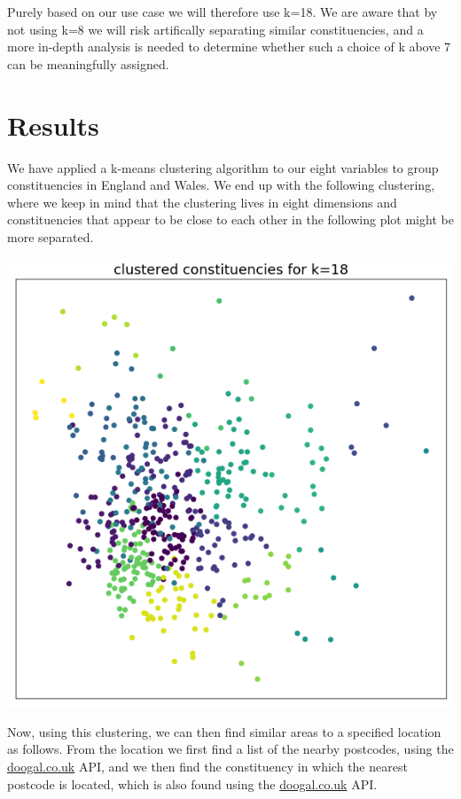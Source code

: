 \documentclass[a4paper, 11pt]{article}
\begin{document}
Purely based on our use case we will therefore use k=18. We are aware that by not using k=8 we will risk artifically separating similar constituencies, and a more in-depth analysis is needed to determine whether such a choice of k above 7 can be meaningfully assigned.

\section{Results}
We have applied a k-means clustering algorithm to our eight variables to group constituencies in England and Wales. We end up with the following clustering, where we keep in mind that the clustering lives in eight dimensions and constituencies that appear to be close to each other in the following plot might be more separated.

\begin{center}
  \includegraphics[scale=.40]{../gfx/cluster_colour.png}
\end{center}

Now, using this clustering, we can then find similar areas to a specified location as follows. From the location we first find a list of the nearby postcodes, using the \url{doogal.co.uk} API, and we then find the constituency in which the nearest postcode is located, which is also found using the \url{doogal.co.uk} API.
\end{document}
